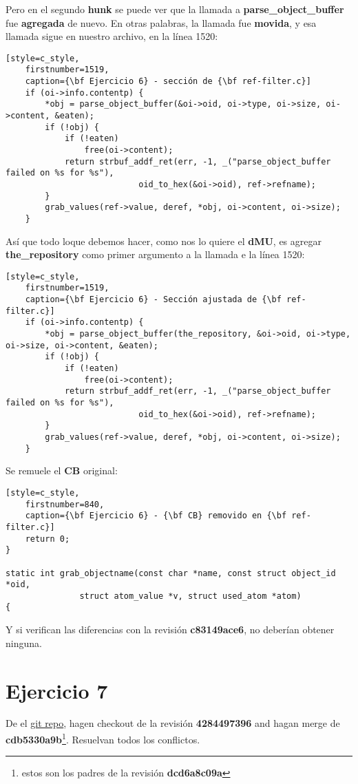 Pero en el segundo {\bf hunk} se puede ver que la llamada a {\bf parse\_object\_buffer} fue {\bf agregada} de nuevo. En otras
palabras, la llamada fue {\bf movida}, y esa llamada sigue en nuestro archivo, en la línea 1520:
\begin{lstlisting}[style=c_style,
	firstnumber=1519,
	caption={\bf Ejercicio 6} - sección de {\bf ref-filter.c}]
	if (oi->info.contentp) {
		*obj = parse_object_buffer(&oi->oid, oi->type, oi->size, oi->content, &eaten);
		if (!obj) {
			if (!eaten)
				free(oi->content);
			return strbuf_addf_ret(err, -1, _("parse_object_buffer failed on %s for %s"),
					       oid_to_hex(&oi->oid), ref->refname);
		}
		grab_values(ref->value, deref, *obj, oi->content, oi->size);
	}
\end{lstlisting}

Así que todo loque debemos hacer, como nos lo quiere el {\bf dMU}, es agregar {\bf the\_repository}
como primer argumento a la llamada e la línea 1520:
\begin{lstlisting}[style=c_style,
	firstnumber=1519,
	caption={\bf Ejercicio 6} - Sección ajustada de {\bf ref-filter.c}]
	if (oi->info.contentp) {
		*obj = parse_object_buffer(the_repository, &oi->oid, oi->type, oi->size, oi->content, &eaten);
		if (!obj) {
			if (!eaten)
				free(oi->content);
			return strbuf_addf_ret(err, -1, _("parse_object_buffer failed on %s for %s"),
					       oid_to_hex(&oi->oid), ref->refname);
		}
		grab_values(ref->value, deref, *obj, oi->content, oi->size);
	}
\end{lstlisting}

Se remuele el {\bf CB} original:
\begin{lstlisting}[style=c_style,
	firstnumber=840,
	caption={\bf Ejercicio 6} - {\bf CB} removido en {\bf ref-filter.c}]
	return 0;
}

static int grab_objectname(const char *name, const struct object_id *oid,
			   struct atom_value *v, struct used_atom *atom)
{
\end{lstlisting}

Y si verifican las diferencias con la revisión {\bf c83149ace6}, no deberían obtener ninguna.

\section{Ejercicio 7}
\label{exercise_07}

De el \hyperref[git_repo]{git repo}, hagen checkout de la revisión {\bf 4284497396} and hagan merge de {\bf cdb5330a9b}\footnote{estos son
los padres de la revisión {\bf dcd6a8c09a}}. Resuelvan todos los conflictos.

